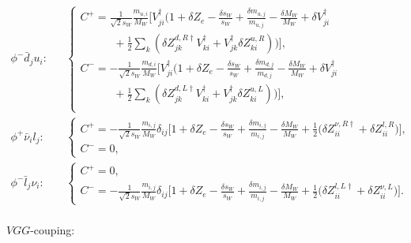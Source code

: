 \begin{eqnarray}
\phi^-\bar{d}_ju_i:&&
\begin{cases}
C^+=\frac{1}{\sqrt{2}s_W}\frac{m_{u,i}}{M_W}\biggl[ V^\dagger_{ji}\biggl( 1+\delta Z_e-\frac{\delta s_W}{s_W}+\frac{\delta m_{u,j}}{m_{u,j}}-\frac{\delta M_W}{M_W}+\delta V_{ji}^\dagger\\
\quad\quad\quad +\frac{1}{2}\sum_k(\delta Z^{d,R\dagger}_{jk}V_{ki}^\dagger+V_{jk}^\dagger\delta Z^{u,R}_{ki}) \biggr) \biggr],\\
C^-=-\frac{1}{\sqrt{2}s_W}\frac{m_{d,i}}{M_W}\biggl[ V^\dagger_{ji}\biggl( 1+\delta Z_e-\frac{\delta s_W}{s_W}+\frac{\delta m_{d,j}}{m_{d,j}}-\frac{\delta M_W}{M_W}+\delta V_{ji}^\dagger\\
\quad\quad\quad +\frac{1}{2}\sum_k(\delta Z^{d,L\dagger}_{jk}V_{ki}^\dagger+V_{jk}^\dagger\delta Z^{u,L}_{ki}) \biggr) \biggr],\\
\end{cases}\nonumber\\
\phi^+\bar{\nu}_il_j:&&
\begin{cases}
C^+=-\frac{1}{\sqrt{2}s_W}\frac{m_{i,j}}{M_W}\delta_{ij}\biggl[  1+\delta Z_e-\frac{\delta s_W}{s_W}+\frac{\delta m_{i,j}}{m_{i,j}}-\frac{\delta M_W}{M_W} +\frac{1}{2}\biggl(\delta Z^{\nu,R\dagger}_{ii}+\delta Z^{l,R}_{ii}  \biggr) \biggr],\\
C^-=0,
\end{cases}\nonumber\\
\phi^-\bar{l}_j\nu_i:&&
\begin{cases}
C^+=0,\\
C^-=-\frac{1}{\sqrt{2}s_W}\frac{m_{i,j}}{M_W}\delta_{ij}\biggl[  1+\delta Z_e-\frac{\delta s_W}{s_W}+\frac{\delta m_{i,j}}{m_{i,j}}-\frac{\delta M_W}{M_W} +\frac{1}{2}\biggl(\delta Z^{l,L\dagger}_{ii}+\delta Z^{\nu,L}_{ii}  \biggr) \biggr].
\end{cases}\nonumber\\
\end{eqnarray}

$VGG$-couping:

